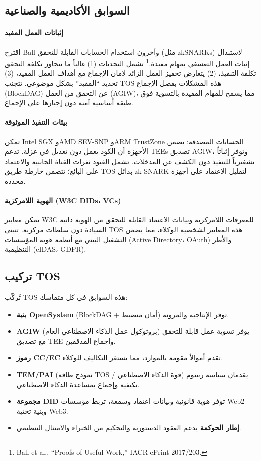 \documentclass[11pt]{article}
\begin{document}
\subsection{السوابق الأكاديمية والصناعية}
\paragraph{إثباتات العمل المفيد} اقترح Ball وآخرون استخدام الحسابات القابلة للتحقق (مثل zkSNARKs) لاستبدال إثبات العمل التعسفي بمهام مفيدة.\footnote{Ball et al., ``Proofs of Useful Work,'' IACR ePrint 2017/203.} تشمل التحديات (1) غالباً ما تتجاوز تكلفة التحقق تكلفة التنفيذ، (2) يتعارض تحفيز العمل الزائد لأمان الإجماع مع أهداف العمل المفيد، (3) تحديد ``المفيد'' بشكل موضوعي. تتجنب TOS هذه المشكلات بفصل الإجماع (BlockDAG) عن التحقق من العمل (AGIW)، مما يسمح للمهام المفيدة بالتسوية فوق طبقة أساسية آمنة دون إجبارها على الإجماع.

\paragraph{بيئات التنفيذ الموثوقة} تمكن Intel SGX وAMD SEV-SNP وARM TrustZone الحسابات المصدقة: يضمن الأجهزة أن الكود يعمل دون تعديل في عزلة. تدعم TEEs تصديق AGIW، وتوفر إثباتاً تشفيرياً للتنفيذ دون الكشف عن المدخلات. تشمل القيود ثغرات القناة الجانبية والاعتماد على البائع؛ تتضمن خارطة طريق TOS بدائل zk-SNARK لتقليل الاعتماد على أجهزة محددة.

\paragraph{الهوية اللامركزية (W3C DIDs، VCs)} تمكن معايير W3C للمعرفات اللامركزية وبيانات الاعتماد القابلة للتحقق من الهوية ذاتية السيادة دون سلطات مركزية. تتبنى TOS هذه المعايير لشخصية الوكلاء، مما يضمن التشغيل البيني مع أنظمة هوية المؤسسات (Active Directory، OAuth) والأطر التنظيمية (eIDAS، GDPR).

\subsection{تركيب TOS}
تُركّب TOS هذه السوابق في كل متماسك:
\begin{itemize}[noitemsep]
  \item \textbf{بنية OpenSystem} (BlockDAG + أمان منضبط) توفر الإنتاجية والمرونة.
  \item \textbf{AGIW} (بروتوكول عمل الذكاء الاصطناعي العام) يوفر تسوية عمل قابلة للتحقق مع تصديق TEE وإجماع المدققين.
  \item \textbf{رموز CC/EC} تقدم أموالاً مقومة بالموارد، مما يستقر التكاليف للوكلاء.
  \item \textbf{TEM/PAI} (نموذج طاقة TOS / قوة الذكاء الاصطناعي) يقدمان سياسة رسوم تكيفية وإجماع بمساعدة الذكاء الاصطناعي.
  \item \textbf{مجموعة DID} توفر هوية قانونية وبيانات اعتماد وسمعة، تربط مؤسسات Web2 وبنية تحتية Web3.
  \item \textbf{إطار الحوكمة} يدعم العقود الدستورية والتحكيم من الخبراء والامتثال التنظيمي.
\end{itemize}
\end{document}
